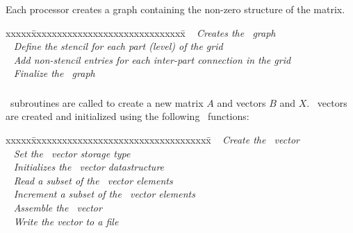 \documentclass[10pt]{article}
\begin{document}
\subsubsection{}


 Each processor creates a graph containing the non-zero structure of
 the matrix.

\begin{tabbing}
xxxxx\=xxxxxxxxxxxxxxxxxxxxxxxxxxxxxx\=\kill
\> \done\ 
   \> \textit{Creates the \hypre\ graph} \\
\> \done\ 
   \> \textit{Define the stencil for each part (level) of the grid} \\
\> \done\ 
   \> \textit{Add non-stencil entries for each inter-part connection in the grid} \\
\> \done\ 
   \> \textit{Finalize the \hypre\ graph}
\end{tabbing}

\subsubsection{}


\hypre\ subroutines are called to create
a new matrix $A$ and vectors $B$ and $X$.  \hypre\ vectors are
created and initialized using the following \hypre\ functions:

\begin{tabbing}
xxxxx\=xxxxxxxxxxxxxxxxxxxxxxxxxxxxxxxxxxx\=\kill
\> \done\ 
   \> \textit{Create the \hypre\ vector} \\
\> \done\ 
   \> \textit{Set the \hypre\ vector storage type} \\
\> \done\ 
   \> \textit{Initializes the \hypre\ vector datastructure} \\
\> \done\ 
   \> \textit{Read a subset of the \hypre\ vector elements} \\
\> \done\ 
   \> \textit{Increment a subset of the \hypre\ vector elements} \\
\> \done\ 
   \> \textit{Assemble the \hypre\ vector} \\
\> \done\ 
   \> \textit{Write the vector to a file}
\end{tabbing}
\end{document}
